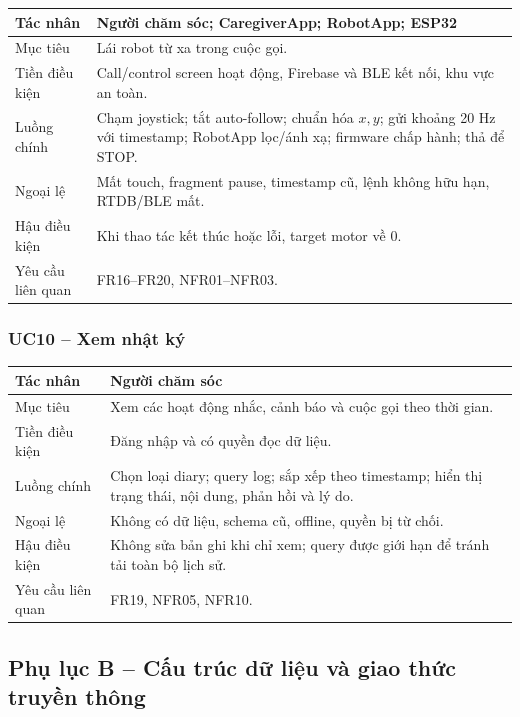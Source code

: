 \begin{longtable}{|p{3.3cm}|p{10.1cm}|}
\hline
Tác nhân & Người chăm sóc; CaregiverApp; RobotApp; ESP32 \\
\hline
Mục tiêu & Lái robot từ xa trong cuộc gọi. \\
\hline
Tiền điều kiện & Call/control screen hoạt động, Firebase và BLE kết nối, khu vực an toàn. \\
\hline
Luồng chính & Chạm joystick; tắt auto-follow; chuẩn hóa $x,y$; gửi khoảng 20 Hz với timestamp; RobotApp lọc/ánh xạ; firmware chấp hành; thả để STOP. \\
\hline
Ngoại lệ & Mất touch, fragment pause, timestamp cũ, lệnh không hữu hạn, RTDB/BLE mất. \\
\hline
Hậu điều kiện & Khi thao tác kết thúc hoặc lỗi, target motor về 0. \\
\hline
Yêu cầu liên quan & FR16--FR20, NFR01--NFR03. \\
\hline
\end{longtable}

\subsubsection*{UC10 -- Xem nhật ký}

\begin{longtable}{|p{3.3cm}|p{10.1cm}|}
\hline
Tác nhân & Người chăm sóc \\
\hline
Mục tiêu & Xem các hoạt động nhắc, cảnh báo và cuộc gọi theo thời gian. \\
\hline
Tiền điều kiện & Đăng nhập và có quyền đọc dữ liệu. \\
\hline
Luồng chính & Chọn loại diary; query log; sắp xếp theo timestamp; hiển thị trạng thái, nội dung, phản hồi và lý do. \\
\hline
Ngoại lệ & Không có dữ liệu, schema cũ, offline, quyền bị từ chối. \\
\hline
Hậu điều kiện & Không sửa bản ghi khi chỉ xem; query được giới hạn để tránh tải toàn bộ lịch sử. \\
\hline
Yêu cầu liên quan & FR19, NFR05, NFR10. \\
\hline
\end{longtable}

\subsection*{Phụ lục B -- Cấu trúc dữ liệu và giao thức truyền thông}

